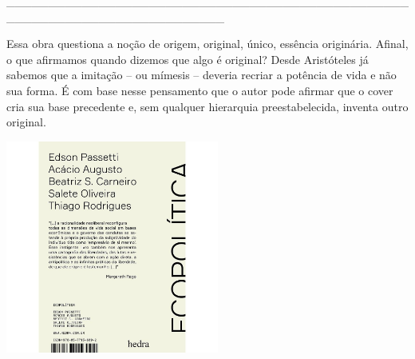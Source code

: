 \hspace*{-2cm}\_\_\_\_\_\_\_\_\_\_\_\_\_\_\_\_\_\_\_\_\_\_\_\_\_\_\_\_\_\_\_\_\_\_\_\_\_\_\_\_\_\_\_\_\_\_\_\_\_\_\_\_\_\_\_\_\_\_\_\_\_\_\_\_\_\_\_\_\_\_\_\_\_\_

\medskip

\noindent{}Essa obra questiona a noção de origem, original, único, essência originária. Afinal, o que afirmamos quando dizemos que algo é original? Desde Aristóteles já sabemos que a imitação – ou mímesis – deveria recriar a potência de vida e não sua forma. É com base nesse pensamento que o autor pode afirmar que o cover cria {} sua base precedente e, sem qualquer hierarquia preestabelecida, inventa outro original.

\hspace{.5cm}

\hspace*{-.4cm}\begin{minipage}[c]{0.90\linewidth}
\small{
{}}
\end{minipage}

\pagebreak

\hspace{.5cm}

\begin{center}
\hspace*{-.5cm}\includegraphics[width=70mm]{eco.jpeg}
\end{center}

